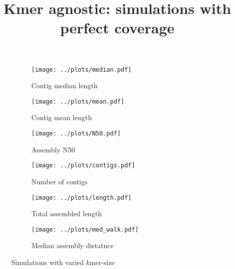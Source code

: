 \documentclass{article}
\title{Kmer agnostic: simulations with perfect coverage}
\begin{document}
\begin{figure}[ht]
\begin{subfigure}{.5\textwidth}
  \centering
  \caption{Contig median length}
  \texttt{[image: ../plots/median.pdf]}
\end{subfigure}
\begin{subfigure}{.5\textwidth}
  \centering
  \caption{Contig mean length}
  \texttt{[image: ../plots/mean.pdf]}
\end{subfigure}
\begin{subfigure}{.5\textwidth}
  \centering
  \caption{Assembly N50}
  \texttt{[image: ../plots/N50.pdf]}
\end{subfigure}
\begin{subfigure}{.5\textwidth}
  \centering
  \caption{Number of contigs}
  \texttt{[image: ../plots/contigs.pdf]}
\end{subfigure}
\begin{subfigure}{.5\textwidth}
  \centering
  \caption{Total assembled length}
  \texttt{[image: ../plots/length.pdf]}
\end{subfigure}
\begin{subfigure}{.5\textwidth}
  \centering
  \caption{Median assembly distatnce}
  \texttt{[image: ../plots/med\_walk.pdf]}
\end{subfigure}
\caption{Simulations with varied $k$mer-size}
\label{fig:kmer_agnostic}
\end{figure}
\end{document}
